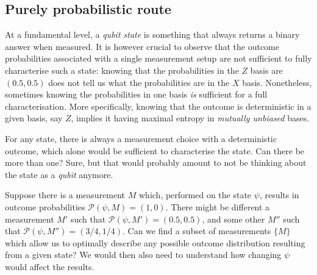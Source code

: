 \documentclass[a4paper]{report}
\newcommand{\calP}{{\mathcal{P}}}
\begin{document}
\subsection{Purely probabilistic route}

At a fundamental level, a \emph{qubit state} is something that always returns a binary answer when measured.
It is however crucial to observe that the outcome probabilities associated with a single measurement setup are not sufficient to fully characterise such a state: knowing that the probabilities in the $Z$ basis are $(0.5,0.5)$ does not tell us what the probabilities are in the $X$ basis.
Nonetheless, sometimes knowing the probabilities in one basis \emph{is} sufficient for a full characterisation. More specifically, knowing that the outcome is deterministic in a given basis, say $Z$, implies it having maximal entropy in \emph{mutually unbiased} bases.

For any state, there is always a measurement choice with a deterministic outcome, which alone would be sufficient to characterise the state. Can there be more than one? Sure, but that would probably amount to not be thinking about the state as a \emph{qubit} anymore.

Suppose there is a measurement $M$ which, performed on the state $\psi$, results in outcome probabilities $\calP(\psi,M)=(1,0)$.
There might be different a measurement $M'$ such that $\calP(\psi,M')=(0.5,0.5)$, and some other $M''$ such that $\calP(\psi,M'')=(3/4,1/4)$. Can we find a subset of measurements $\{M\}$ which allow us to optimally describe any possible outcome distribution resulting from a given state?
We would then also need to understand how changing $\psi$ would affect the results.
\end{document}
